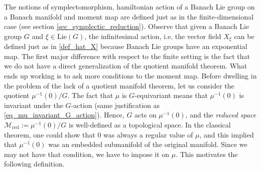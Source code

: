 The notions of symplectomorphism, hamiltonian action of a Banach Lie group on a Banach manifold and moment map are defined just as in the finite-dimensional case (see section \ref{sec_symplectic_reduction}). Observe that given a Banach Lie group \(G\) and \(\xi \in \mathrm{Lie}(G)\), the infinitesimal action, i.e. the vector field \(X_{\xi}\) can be defined just as in \eqref{def_hat_X} because Banach Lie groups have an exponential map. The first major difference with respect to the finite setting is the fact that we do not have a direct generalization of the quotient manifold theorem. What ends up working is to ask more conditions to the moment map. Before dwelling in the problem of the lack of a quotient manifold theorem, let us consider the quotient \(\mu^{-1}(0)/G\). The fact that \(\mu\) is \(G\)-equivariant means that \(\mu^{-1}(0)\) is invariant under the \(G\)-action (same justification as \eqref{eq_mu_invariant_G_action}). Hence, \(G\) acts on \(\mu^{-1}(0)\), and the \textit{reduced space} \(\mathcal{M}_{\mathrm{red}}:=\mu^{-1}(0)/G\) is well-defined as a topological space. In the classical theorem, one could show that \(0\) was always a regular value of \(\mu\), and this implied that \(\mu^{-1}(0)\) was an embedded submanifold of the original manifold. Since we may not have that condition, we have to impose it on \(\mu\). This motivates the following definition.


